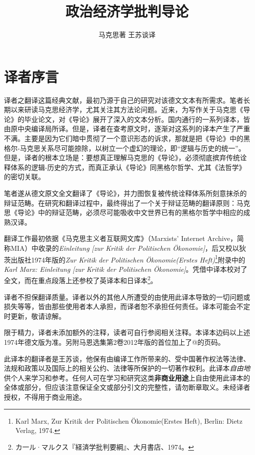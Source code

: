 \documentclass[a4paper,twoside,12pt]{ctexart}
\title{政治经济学批判导论}
\author{马克思著 \quad 王苏谈译}
\begin{document}
\maketitle

\newpage

\tableofcontents

\newpage

\section{译者序言}

译者之翻译这篇经典文献，最初乃源于自己的研究对该德文文本有所需求。笔者长期以来研读马克思经济学，尤其关注其方法论问题。近来，为写作关于马克思《导论》的毕业论文，对《导论》展开了深入的文本分析。国内通行的一系列译本，皆由原中央编译局所译。但是，译者在查考原文时，逐渐对这系列的译本产生了严重不满。主要是因为它们暗中贯彻了一个意识形态的诉求，那就是把《导论》中的黑格尔-马克思关系尽可能捺除，以树立一个虚幻的理论，即“逻辑与历史的统一”。但是，译者的根本立场是：要想真正理解马克思的《导论》，必须彻底摈弃传统诠释体系的逻辑-历史的方式，而真正承认《导论》同黑格尔哲学、尤其《法哲学》的密切关联。

笔者遂从德文原文全文翻译了《导论》，并力图恢复被传统诠释体系所刻意抹杀的辩证范畴。在研究和翻译过程中，最终得出了一个关于辩证范畴的翻译原则：马克思《导论》中的辩证范畴，必须尽可能吸收中文世界已有的黑格尔哲学中相应的成熟汉译。

翻译工作最初依据《马克思主义者互联网文库》（Marxists’ Internet Archive，简称MIA）中收录的\textit{Einleitung [zur Kritik der Politischen Ökonomie]}，后又校以狄茨出版社1974年版的\textit{Zur Kritik der Politischen Ökonomie(Erstes Heft)}\footnote{Karl Marx, Zur Kritik der Politischen Ökonomie(Erstes Heft), Berlin: Dietz Verlag, 1974. }附录中的\textit{Karl Marx: Einleitung [zur Kritik der Politischen Ökonomie]}。凭借中译本校对了全文，而在重点段落上还参校了英译本和日译本\footnote{\mincho カ一ル·マルクス『経済学批判要綱』、大月書店、1974。}。

译者不担保翻译质量。译者以外的其他人所遭受的由使用此译本导致的一切问题或损失等等，皆由那些使用者本人承担，而译者恕不承担任何责任。译本可能会不定时更新，敬请谅解。

限于精力，译者未添加额外的注释，读者可自行参阅相关注释。本译本边码以上述1974年德文版为准。另附马恩选集第2卷2012年版的首位加上了@的页码。

此译本的翻译者是王苏谈，他保有由编译工作所带来的、受中国著作权法等法律、法规和政策以及国际上的相关公约、法律等所保护的一切著作权利。此译本\textit{自由地}供个人来学习和参考。任何人可在学习和研究这类\textbf{非商业用途}上自由使用此译本的全体或部分，但应该注意保证全文或部分引文的完整性，请勿断章取义。未经译者授权，不得用于商业用途。
\end{document}
